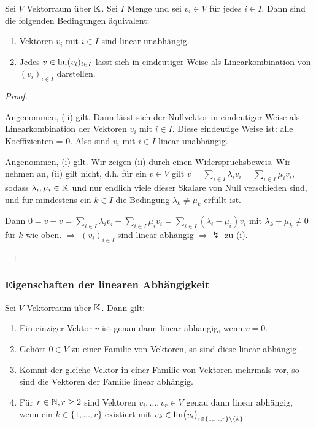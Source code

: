 \begin{thm}
	Sei $ V $ Vektorraum über $ \mathbb K $. Sei $ I $ Menge und sei $ v_i \in V $ für jedes $ i \in I $. Dann sind die folgenden Bedingungen äquivalent:
	\begin{enumerate}
		\item Vektoren  $ v_i $ mit $ i \in I $ sind linear unabhängig.
		\item Jedes $ v \in \operatorname{lin}(v_i)_{i \in I} $ lässt sich in eindeutiger Weise als Linearkombination von $ (v_i)_{i \in I} $ darstellen.
	\end{enumerate}
\end{thm}
\begin{proof}\
\begin{description}[font=\normalfont]
	\item[(ii) $ \Rightarrow $ (i):]
	Angenommen, (ii) gilt. Dann lässt sich der Nullvektor in eindeutiger Weise als Linearkombination der Vektoren $ v_i $ mit $ i \in I $. Diese eindeutige Weise ist: alle Koeffizienten = 0. Also sind $ v_i $ mit $ i \in I $ linear unabhängig.

	\item[(i) $ \Rightarrow $ (ii):]
	Angenommen, (i) gilt. Wir zeigen (ii) durch einen Widerspruchsbeweis. Wir nehmen an, (ii) gilt nicht, d.h. für ein $ v \in V $ gilt $ v = \sum_{i \in I} \lambda_iv_i = \sum_{i \in I} \mu_iv_i $, sodass $ \lambda_i, \mu_i \in \mathbb K $ und nur endlich viele dieser Skalare von Null verschieden sind, und für mindestens ein $ k \in I $ die Bedingung $ \lambda_k \neq \mu_k $ erfüllt ist.

	Dann $ 0 = v - v = \sum_{i \in I} \lambda_iv_i - \sum_{i \in I} \mu_iv_i = \sum_{i \in I} (\lambda_i - \mu_i)v_i $ mit $ \lambda_k - \mu_k \neq 0 $ für $ k $ wie oben. $ \Rightarrow $ $ (v_i)_{i \in I} $ sind linear abhängig $ \Rightarrow \lightning $ zu (i). \qedhere
\end{description}
\end{proof}

\subsubsection{Eigenschaften der linearen Abhängigkeit}

\begin{propn}
	Sei $ V $ Vektorraum über $ \mathbb K $. Dann gilt:
	\begin{enumerate}
		\item Ein einziger Vektor $ v $ ist genau dann linear abhängig, wenn $ v = 0 $.
		\item Gehört $ 0 \in V $ zu einer Familie von Vektoren, so sind diese linear abhängig.
		\item Kommt der gleiche Vektor in einer Familie von Vektoren mehrmals vor, so sind die Vektoren der Familie linear abhängig. 
		\item Für $ r \in \mathbb N, r \geq 2 $ sind Vektoren $ v_i, \ldots, v_r \in V $ genau dann linear abhängig, wenn ein $ k \in \{ 1, \ldots, r \} $ existiert mit $ v_k \in \operatorname{lin} \bigl(v_i \bigr)_{i \in \{ 1, \ldots, r \} \setminus \{ k\} } $.
	\end{enumerate}
\end{propn}


